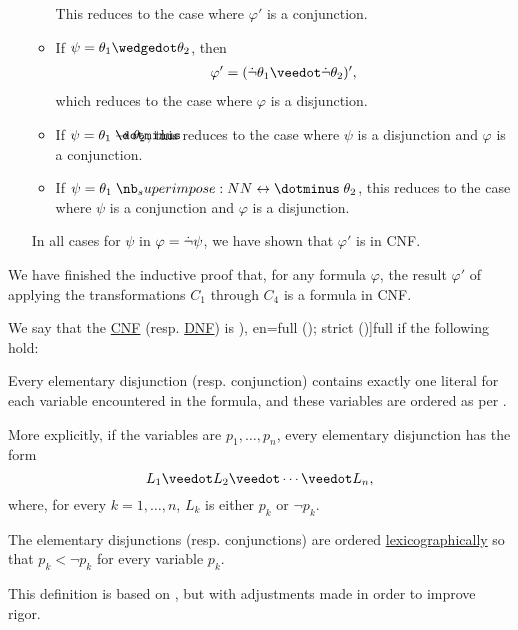\begin{defproof}
\begin{itemize}
\begin{itemize}
      This reduces to the case where \( \varphi' \) is a conjunction.

      \item If \( \psi = \theta_1 \synwedge \theta_2 \), then
      \begin{align*}
        \varphi'
        =
        (\synneg \theta_1 \synvee \synneg \theta_2)',
      \end{align*}
      which reduces to the case where \( \varphi \) is a disjunction.

      \item If \( \psi = \theta_1 \synimplies \theta_2 \), this reduces to the case where \( \psi \) is a disjunction and \( \varphi \) is a conjunction.
      \item If \( \psi = \theta_1 \syniff \theta_2 \), this reduces to the case where \( \psi \) is a conjunction and \( \varphi \) is a disjunction.
    \end{itemize}

    In all cases for \( \psi \) in \( \varphi = \dot\neg \psi \), we have shown that \( \varphi' \) is in CNF.
  \end{itemize}

  We have finished the inductive proof that, for any formula \( \varphi \), the result \( \varphi' \) of applying the transformations \( C_1 \) through \( C_4 \) is a formula in CNF.
\end{defproof}

\begin{definition}\label{def:full_cnf_and_dnf}\mimprovised
  We say that the \hyperref[def:cnf_and_dnf]{CNF} (resp. \hyperref[def:cnf_and_dnf]{DNF}) is \term[ru=совершенная (\cite[def. 6.3; def. 6.4]{Эдельман1975Логика}), en=full (); strict (\cite[def. 1.3.10]{Hinman2005Logic})]{full} if the following hold:
  \begin{thmenum}
     Every elementary disjunction (resp. conjunction) contains exactly one literal for each variable encountered in the formula, and these variables are ordered as per .

    More explicitly, if the variables are \( p_1, \ldots, p_n \), every elementary disjunction has the form
    \begin{equation*}
      L_1 \synvee L_2 \synvee \cdots \synvee L_n,
    \end{equation*}
    where, for every \( k = 1, \ldots, n \), \( L_k \) is either \( p_k \) or \( \neg p_k \).

     The elementary disjunctions (resp. conjunctions) are ordered \hyperref[def:lexicographic_order]{lexicographically} so that \( p_k < \neg p_k \) for every variable \( p_k \).
  \end{thmenum}
\end{definition}
\begin{comments}
  \item This definition is based on \cite[def. 6.3; def. 6.4]{Эдельман1975Логика}, but with adjustments made in order to improve rigor.
\end{comments}

